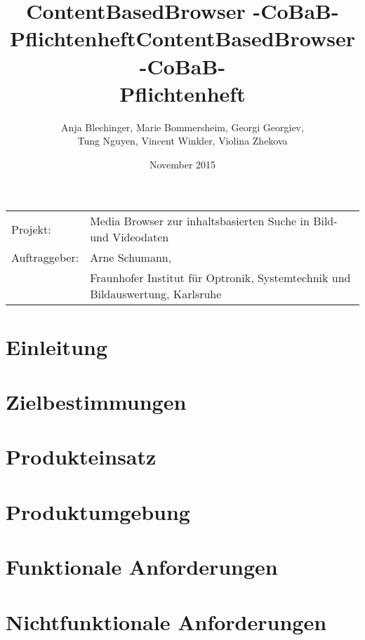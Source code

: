\documentclass[parskip=full]{scrartcl}
\title{ContentBasedBrowser -CoBaB- \\ Pflichtenheft}
\begin{document}
\begin{titlepage}
\title{ContentBasedBrowser -CoBaB- \\ Pflichtenheft}
\author{Anja Blechinger, Marie Bommersheim, Georgi Georgiev,\\ Tung Nguyen, Vincent Winkler, Violina Zhekova}
\date{November 2015}
\maketitle
\vspace{300pt}
\begin{tabular}{l l}
Projekt: & Media Browser zur inhaltsbasierten Suche in Bild- und Videodaten\\
Auftraggeber: & Arne Schumann,\\
 & Fraunhofer Institut für Optronik, Systemtechnik und Bildauswertung, Karlsruhe\\
\end{tabular}
\thispagestyle{empty}
\end{titlepage}
\setcounter{page}{1}

\tableofcontents
\pagebreak

\section{Einleitung}


\section{Zielbestimmungen}


\section{Produkteinsatz}


\section{Produktumgebung}


\section{Funktionale Anforderungen}


\section{Nichtfunktionale Anforderungen}

\end{document}
